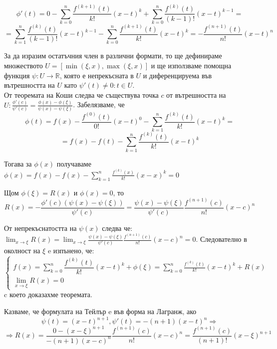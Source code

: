 \documentclass[fleqn,12pt]{article}
\begin{document}
\[\phi'(t)=0 - \sum_{k=0}^{n} \frac{f^{(k+1)}(t)}{k!}(x-t)^{k} +  \sum_{k=0}^{n}\frac{f^{(k)}(t)}{(k-1)!}(x-t)^{k-1} = \]
\[ =\sum_{k=1}^{n}\frac{f^{(k)}(t)}{(k-1)!}(x-t)^{k-1} - \sum_{k=0}^{n} \frac{f^{(k+1)}(t)}{k!}(x-t)^{k} = -\frac{f^{(n+1)}(t)}{n!}(x-t)^n \]

За да изразим остатъчния член в различни формати, то ще дефинираме множеството $U=[\min(\xi,x),\max(\xi,x)]$ и ще използваме помощна функция $\psi:U\rightarrow\mathbb{R}$, която е непрекъсната в $U$
и диференцируема във вътрешността на $U$ като $\psi'(t) \neq 0 : t \in U$.\\
От теоремата на Коши следва че съществува точка $c$ от вътрешността на $U: \frac{\phi'(c)}{\psi'(c)}=\frac{\phi(x)-\phi(\xi)}{\psi(x)-\psi(\xi)}$.
Забелязваме, че
\[ \phi(t) = f(x) - \frac{f^{(0)}(t)}{0!}(x-t)^0 - \sum_{k=1}^{n}\frac{f^{(k)}(t)}{k!}(x-t)^k = \] 
\[ = f(x) - f(t) - \sum_{k=1}^{n}\frac{f^{(k)}(t)}{k!}(x-t)^k \]

Тогава за $\phi(x)$ получаваме $\phi(x) = f(x) - f(x) - \sum_{k=1}^{n}\frac{f^{(k)}(x)}{k!}(x-x)^k = 0$

Щом $\phi(\xi) = R(x)$ и $\phi(x) = 0$, то 
\[R(x) = -\frac{\phi'(c)(\psi(x)-\psi(\xi))}{\psi'(c)} = \frac{\psi(x)-\psi(\xi)}{\psi'(c)}\frac{f^{(n+1)}(c)}{n!}(x-c)^n\]

От непрекъснатостта на $\psi(x)$ следва че: $\lim_{x\to\xi} R(x) = \lim_{x\to\xi} \frac{\psi(x)-\psi(\xi)}{\psi'(c)}\frac{f^{(n+1)}(c)}{n!}(x-c)^n = 0$.
Следователно в околност на $\xi$ e изпънено, че:
\[
\begin{cases}
    f(x) = \sum_{k = 0}^{n} \dfrac{f^{(k)}(t)}{k!}(x-t)^{k} + \phi(\xi) = \sum_{k = 0}^{n} \frac{f^{(k)}(t)}{k!}(x-t)^{k} + R(x)\\
    \lim_{x\to\xi} R(x) = 0
\end{cases}
\]
c което доказахме теоремата. 

Казваме, че формулата на Тейлър e във форма на Лагранж, ако 
\[ \psi(t)=(x-t)^{n+1}, \psi'(t)=-(n+1)(x-t)^n \Rightarrow \]
\[ \Rightarrow R(x)=\frac{0-(x-\xi)^{n+1}}{-(n+1)(x-c)^n}\frac{f^{(n+1)}(c)}{n!}(x-c)^n = \frac{f^{(n+1)}(c)}{(n+1)!}(x-\xi)^{n+1} \]
\end{document}
